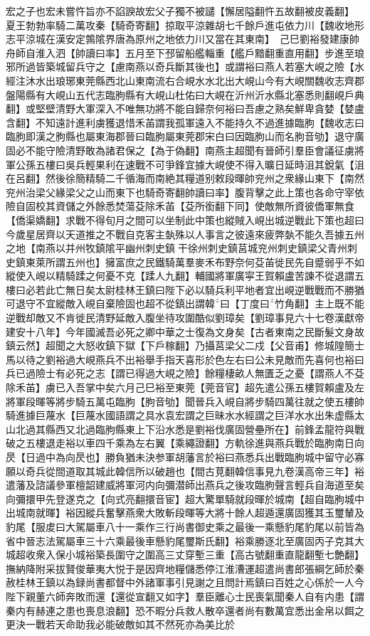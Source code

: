 宏之子也宏未嘗忤旨亦不諂諛故宏父子獨不被譴【懈居隘翻忤五故翻被皮義翻】　夏王勃勃率騎二萬攻秦【騎奇寄翻】掠取平涼雜胡七千餘戶進屯依力川【魏收地形志平涼城在漢安定鶉隂界唐為原州之地依力川又當在其東南】　己巳劉裕發建康帥舟師自淮入泗【帥讀曰率】五月至下邳留船艦輜重【艦戶黯翻重直用翻】步進至琅邪所過皆築城留兵守之【慮南燕以奇兵斷其後也】或謂裕曰燕人若塞大峴之險【水經注沐水出琅琊東莞縣西北山東南流右合峴水水北出大峴山今有大峴關魏收志齊郡盤陽縣有大峴山五代志臨胊縣有大峴山杜佑曰大峴在沂州沂水縣北塞悉則翻峴戶典翻】或堅壁清野大軍深入不唯無功將不能自歸奈何裕曰吾慮之熟矣鮮卑貪婪【婪盧含翻】不知遠計進利虜獲退惜禾苖謂我孤軍遠入不能持久不過進據臨朐【魏收志曰臨朐即漢之朐縣也屬東海郡晉曰臨胊屬東莞郡宋白曰因臨胊山而名朐音劬】退守廣固必不能守險清野敢為諸君保之【為于偽翻】南燕主超聞有晉師引羣臣會議征虜將軍公孫五樓曰吳兵輕果利在速戰不可爭鋒宜據大峴使不得入曠日延時沮其銳氣【沮在呂翻】然後徐簡精騎二千循海而南絶其糧道别敕段暉帥兖州之衆緣山東下【南然兖州治梁父緣梁父之山而東下也騎奇寄翻帥讀曰率】腹背擊之此上策也各命守宰依險自固校其資儲之外餘悉焚蕩芟除禾苖【芟所銜翻下同】使敵無所資彼僑軍無食【僑渠嬌翻】求戰不得旬月之間可以坐制此中策也縱賊入峴出城逆戰此下策也超曰今歲星居齊以天道推之不戰自克客主埶殊以人事言之彼遠來疲弊埶不能久吾據五州之地【南燕以并州牧鎮隂平幽州刺史鎮干徐州刺史鎮莒城兖州刺史鎮梁父青州刺史鎮東萊所謂五州也】擁富庶之民鐵騎萬羣麥禾布野奈何芟苖徙民先自蹙弱乎不如縱使入峴以精騎蹂之何憂不克【蹂人九翻】輔國將軍廣寜王賀賴盧苦諫不從退謂五樓曰必若此亡無日矣太尉桂林王鎮曰陛下必以騎兵利平地者宜出峴逆戰戰而不勝猶可退守不宜縱敵入峴自棄險固也超不從鎮出謂韓曰【丁度曰竹角翻】主上既不能逆戰却敵又不肯徙民清野延敵入腹坐待攻圍酷似劉璋矣【劉璋事見六十七卷漢獻帝建安十八年】今年國滅吾必死之卿中華之士復為文身矣【古者東南之民斷髮文身故鎮云然】超聞之大怒收鎮下獄【下戶稼翻】乃攝莒梁父二戍【父音甫】修城隍簡士馬以待之劉裕過大峴燕兵不出裕舉手指天喜形於色左右曰公未見敵而先喜何也裕曰兵已過險士有必死之志【謂已得過大峴之險】餘糧棲畝人無匱乏之憂【謂燕人不芟除禾苖】虜已入吾掌中矣六月己巳裕至東莞【莞音官】超先遣公孫五樓賀賴盧及左將軍段暉等將步騎五萬屯臨朐【朐音劬】聞晉兵入峴自將步騎四萬往就之使五樓帥騎進據巨蔑水【巨蔑水國語謂之具水袁宏謂之巨昧水水經謂之巨洋水水出朱虚縣太山北過其縣西又北過臨朐縣東上下沿水悉是劉裕伐廣固營壘所在】前鋒孟龍符與戰破之五樓退走裕以車四千乘為左右翼【乘繩證翻】方軌徐進與燕兵戰於臨朐南日向昃【日過中為向昃也】勝負猶未決参軍胡藩言於裕曰燕悉兵出戰臨朐城中留守必寡願以奇兵從間道取其城此韓信所以破趙也【間古莧翻韓信事見九卷漢高帝三年】裕遣藩及諮議參軍檀韶建威將軍河内向彌潜師出燕兵之後攻臨朐聲言輕兵自海道至矣向彌擐甲先登遂克之【向式亮翻擐音宦】超大驚單騎就段暉於城南【超自臨胊城中出城南就暉】裕因縱兵奮擊燕衆大敗斬段暉等大將十餘人超遁還廣固獲其玉璽輦及豹尾【服䖍曰大駕屬車八十一乘作三行尚書御史乘之最後一乘懸豹尾豹尾以前皆為省中晉志法駕屬車三十六乘最後車懸豹尾璽斯氏翻】裕乘勝逐北至廣固丙子克其大城超收衆入保小城裕築長圍守之圍高三丈穿塹三重【高古號翻重直龍翻塹七艶翻】撫納降附采拔賢俊華夷大悦于是因齊地糧儲悉停江淮漕運超遣尚書郎張綱乞師於秦赦桂林王鎮以為録尚書都督中外諸軍事引見謝之且問計焉鎮曰百姓之心係於一人今陛下親董六師奔敗而還【還從宣翻又如字】羣臣離心士民喪氣聞秦人自有内患【謂秦内有赫連之患也喪息浪翻】恐不暇分兵救人散卒還者尚有數萬宜悉出金帛以餌之更決一戰若天命助我必能破敵如其不然死亦為美比於
